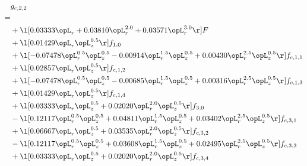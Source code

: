\begin{alignat}{2} 
\label{eq:g_22_0} 
& g_{c,2,2} \nonumber \\ 
 = \\ 
& + \l[  0.03333 \opL_r +  0.03810 \opL_r^{2.0} +  0.03571 \opL_r^{3.0}  \r] F \nonumber \\ 
& + \l[  0.01429 \opL_r \opL_z^{0.5}  \r] f_{1,0} \nonumber \\ 
& + \l[  -0.07478 \opL_r^{0.5} \opL_z^{0.5}   -0.00914 \opL_r^{1.5} \opL_z^{0.5} +  0.00430 \opL_r^{2.5} \opL_z^{0.5}  \r] f_{c,1,1} \nonumber \\ 
& + \l[  0.02857 \opL_r \opL_z^{0.5}  \r] f_{c,1,2} \nonumber \\ 
& + \l[  -0.07478 \opL_r^{0.5} \opL_z^{0.5}   -0.00685 \opL_r^{1.5} \opL_z^{0.5} +  0.00316 \opL_r^{2.5} \opL_z^{0.5}  \r] f_{c,1,3} \nonumber \\ 
& + \l[  0.01429 \opL_r \opL_z^{0.5}  \r] f_{c,1,4} \nonumber \\ 
& + \l[  0.03333 \opL_r \opL_z^{0.5} +  0.02020 \opL_r^{2.0} \opL_z^{0.5}  \r] f_{3,0} \nonumber \\ 
& - \l[  0.12117 \opL_r^{0.5} \opL_z^{0.5} +  0.04811 \opL_r^{1.5} \opL_z^{0.5} +  0.03402 \opL_r^{2.5} \opL_z^{0.5}  \r] f_{c,3,1} \nonumber \\ 
& + \l[  0.06667 \opL_r \opL_z^{0.5} +  0.03535 \opL_r^{2.0} \opL_z^{0.5}  \r] f_{c,3,2} \nonumber \\ 
& - \l[  0.12117 \opL_r^{0.5} \opL_z^{0.5} +  0.03608 \opL_r^{1.5} \opL_z^{0.5} +  0.02495 \opL_r^{2.5} \opL_z^{0.5}  \r] f_{c,3,3} \nonumber \\ 
& + \l[  0.03333 \opL_r \opL_z^{0.5} +  0.02020 \opL_r^{2.0} \opL_z^{0.5}  \r] f_{c,3,4} \nonumber \\ 
\end{alignat} 


